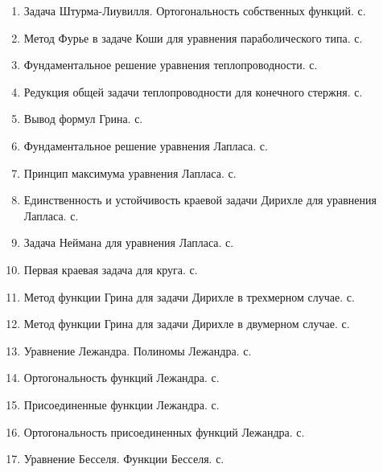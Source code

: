 \begin{enumerate}
\item Задача Штурма-Лиувилля. Ортогональность собственных функций. с.~\pageref{que:15}\\
\item Метод Фурье в задаче Коши для уравнения параболического типа. с.~\pageref{que:16}\\
\item Фундаментальное решение уравнения теплопроводности. с.~\pageref{que:17}\\
\item Редукция общей задачи теплопроводности для конечного стержня. с.~\pageref{que:18}\\
\item Вывод формул Грина. с.~\pageref{que:19}\\
\item Фундаментальное решение уравнения Лапласа. с.~\pageref{que:20}\\
\item Принцип максимума уравнения Лапласа. с.~\pageref{que:21}\\
\item Единственность и устойчивость краевой задачи Дирихле для уравнения Лапласа.  с.~\pageref{que:22}\\
\item Задача Неймана для уравнения Лапласа. с.~\pageref{que:23}\\
\item Первая краевая задача для круга. с.~\pageref{que:24}\\
\item Метод функции Грина для задачи Дирихле в трехмерном случае. с.~\pageref{que:25}\\
\item Метод функции Грина для задачи Дирихле в двумерном случае. с.~\pageref{que:26}\\
\item Уравнение Лежандра. Полиномы Лежандра. с.~\pageref{que:27}\\
\item Ортогональность функций Лежандра. с.~\pageref{que:28}\\
\item Присоединенные функции Лежандра. с.~\pageref{que:29}\\
\item Ортогональность присоединенных функций Лежандра. с.~\pageref{que:30}\\
\item Уравнение Бесселя. Функции Бесселя. с.~\pageref{que:31}\\

\end{enumerate}
